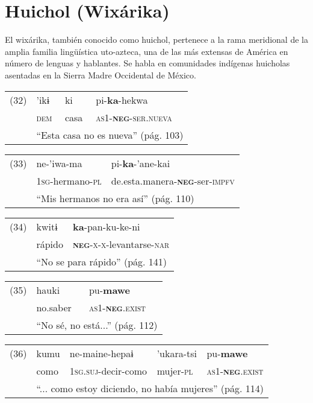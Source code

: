 \section*{Huichol (Wixárika)}

\noindent El wixárika, también conocido como huichol, pertenece a la rama meridional de la amplia familia lingüística uto-azteca, una de las más extensas de América en número de lenguas y hablantes. Se habla en comunidades indígenas huicholas asentadas en la Sierra Madre Occidental de México. \vspace{0.5cm}

{\setmainfont{Charis SIL} 

\begin{tabular}{llll}
(32) & 'ikɨ & ki & pi-\textbf{ka}-hekwa \\
& \textsc{dem} & casa & \textsc{as1-\textbf{neg}-ser.nueva} \\
& \multicolumn{3}{l}{``Esta casa no es nueva'' (pág. 103)}
\end{tabular} \vspace{0.5cm}

\begin{tabular}{lll}
(33) & ne-'iwa-ma & pi-\textbf{ka}-'ane-kai \\
& \textsc{1sg}-hermano-\textsc{pl} & de.esta.manera-\textsc{\textbf{neg}}-ser-\textsc{impfv} \\
& \multicolumn{2}{l}{``Mis hermanos no era así'' (pág. 110)}
\end{tabular} \vspace{0.3cm}

\begin{tabular}{lll}
(34) & kwitɨ & \textbf{ka}-pan-ku-ke-ni \\
& rápido & \textsc{\textbf{neg}-x-x}-levantarse-\textsc{nar} \\
& \multicolumn{2}{l}{``No se para rápido'' (pág. 141)}
\end{tabular} \vspace{0.3cm}

\begin{tabular}{lll}
(35) & hauki & pu-\textbf{mawe} \\
& no.saber & \textsc{as1-\textbf{neg}.exist} \\
& \multicolumn{2}{l}{``No sé, no está...'' (pág. 112)}
\end{tabular} \vspace{0.3cm}

\begin{tabular}{lllll}
(36) & kumu & ne-maine-hepaɨ & 'ukara-tsi & pu-\textbf{mawe} \\
& como & \textsc{1sg.suj}-decir-como & mujer-\textsc{pl} & \textsc{as1-\textbf{neg}.exist} \\
& \multicolumn{4}{l}{``... como estoy diciendo, no había mujeres'' (pág. 114)}
\end{tabular} \vspace{0.3cm}

}

